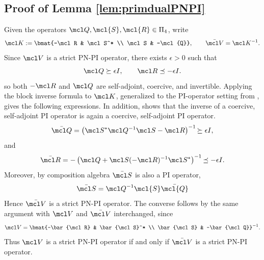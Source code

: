 \subsection{Proof of Lemma \ref{lem:primdualPNPI}}\label{proof:primdualPNPI}
Given the operators $\mcl Q, \mcl{S}, \mcl{R} \in \Pi_4$, write
\begin{equation*}
	\mcl K:=\bmat{-\mcl R & \mcl S^* \\ \mcl S & -\mcl{Q}},
	\qquad
	\bar{\mcl V}=\mcl K^{-1}.
\end{equation*}
Since \(\mcl V\) is a strict PN-PI operator, there exists \(\epsilon>0\) such that
\begin{equation*}
	\mcl Q\succeq \epsilon I,
	\qquad
	\mcl R\preceq -\epsilon I.
\end{equation*}
so both \(-\mcl R\) and \(\mcl Q\) are self-adjoint, coercive, and invertible. Applying the block inverse formula to \(\mcl K\), generalized to the PI-operator setting from \cite{lu2002inverses}, gives the following expressions. In addition, \cite[Theorem 2]{peet2018convexsolutionhinftyoptimalcontroller} shows that the inverse of a coercive, self-adjoint PI operator is again a coercive, self-adjoint PI operator.
\begin{equation*}
	\bar{\mcl Q}
	=
	\left(\mcl S^*\mcl Q^{-1}\mcl S -\mcl R\right)^{-1}
	{\succeq \epsilon I},
\end{equation*}
and
\begin{equation*}
	\bar{\mcl R}
	=
	-\left(\mcl Q+\mcl S(-\mcl R)^{-1}\mcl S^*\right)^{-1}
	{\preceq -\epsilon I}.
\end{equation*}
Moreover, by composition algebra $\bar{\mcl S}$ is also a PI operator,
\begin{equation*}
	\bar{\mcl S} = {\mcl Q}^{-1} \mcl{S}\bar{\mcl{Q}}
\end{equation*}
Hence \(\bar{\mcl V}\) is a strict PN-PI operator. The converse follows by the same argument with \(\mcl V\) and \(\bar{\mcl V}\) interchanged, since
\begin{equation*}
	\mcl V=\bmat{-\bar{\mcl R} & \bar{\mcl S}^* \\ \bar{\mcl S} & -\bar{\mcl Q}}^{-1}.
\end{equation*}
Thus \(\mcl V\) is a strict PN-PI operator if and only if \(\bar{\mcl V}\) is a strict PN-PI operator.

